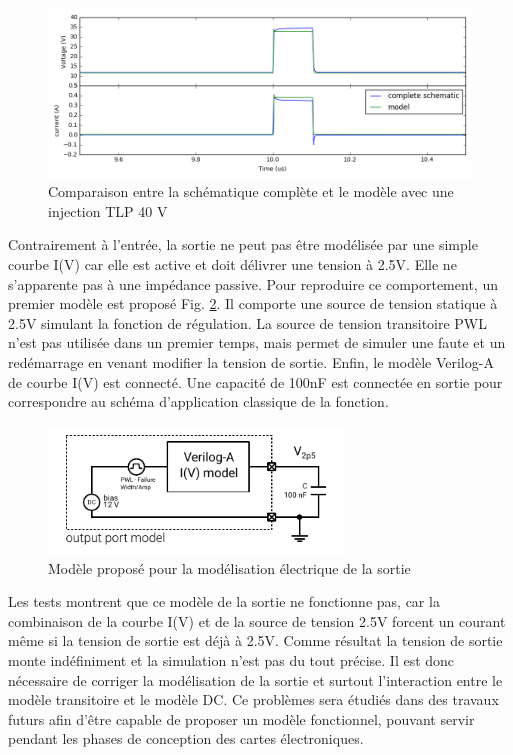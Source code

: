 \begin{figure}[!h]
  \centering
  \includegraphics[width=\textwidth]{src/1/figures/comparison_model_total_40V.png}
  \caption{Comparaison entre la schématique complète et le modèle avec une injection TLP 40 V}
  \label{fig:compare-model-simu-m10}
\end{figure}

Contrairement à l'entrée, la sortie ne peut pas être modélisée par une simple courbe I(V) car elle est active et doit délivrer une tension à 2.5V.
Elle ne s'apparente pas à une impédance passive.
Pour reproduire ce comportement, un premier modèle est proposé Fig. \ref{fig:first-output-model}.
Il comporte une source de tension statique à 2.5V simulant la fonction de régulation.
La source de tension transitoire PWL n'est pas utilisée dans un premier temps, mais permet de simuler une faute et un redémarrage en venant modifier la tension de sortie.
Enfin, le modèle Verilog-A de courbe I(V) est connecté.
Une capacité de 100nF est connectée en sortie pour correspondre au schéma d'application classique de la fonction.

\begin{figure}[!h]
  \centering
  \includegraphics[width=0.7\textwidth]{src/1/figures/first_output_model.pdf}
  \caption{Modèle proposé pour la modélisation électrique de la sortie}
  \label{fig:first-output-model}
\end{figure}

Les tests montrent que ce modèle de la sortie ne fonctionne pas, car la combinaison de la courbe I(V) et de la source de tension 2.5V forcent un courant même si la tension de sortie est déjà à 2.5V.
Comme résultat la tension de sortie monte indéfiniment et la simulation n'est pas du tout précise.
Il est donc nécessaire de corriger la modélisation de la sortie et surtout l’interaction entre le modèle transitoire et le modèle DC.
Ce problèmes sera étudiés dans des travaux futurs afin d'être capable de proposer un modèle fonctionnel, pouvant servir pendant les phases de conception des cartes électroniques.


